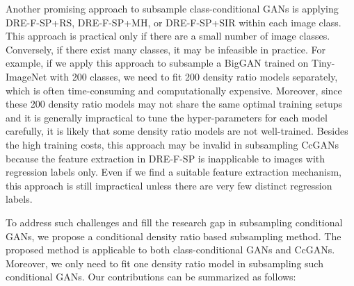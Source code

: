 \documentclass[10pt, twocolumn]{article}
\theoremstyle{definition}
\begin{document}
Another promising approach to subsample class-conditional GANs is applying DRE-F-SP+RS, DRE-F-SP+MH, or DRE-F-SP+SIR \cite{ding2020subsampling} within each image class. This approach is practical only if there are a small number of image classes. Conversely, if there exist many classes, it may be infeasible in practice. For example, if we apply this approach to subsample a BigGAN trained on Tiny-ImageNet \cite{Le2015TinyIV} with 200 classes, we need to fit 200 density ratio models separately, which is often time-consuming and computationally expensive. Moreover, since these 200 density ratio models may not share the same optimal training setups and it is generally impractical to tune the hyper-parameters for each model carefully, it is likely that some density ratio models are not well-trained. Besides the high training costs, this approach may be invalid in subsampling CcGANs because the feature extraction in DRE-F-SP is inapplicable to images with regression labels only. Even if we find a suitable feature extraction mechanism, this approach is still impractical unless there are very few distinct regression labels.

To address such challenges and fill the research gap in subsampling conditional GANs, we propose a conditional density ratio based subsampling method. The proposed method is applicable to both class-conditional GANs and CcGANs. Moreover, we only need to fit one density ratio model in subsampling such conditional GANs. Our contributions can be summarized as follows:
\end{document}
